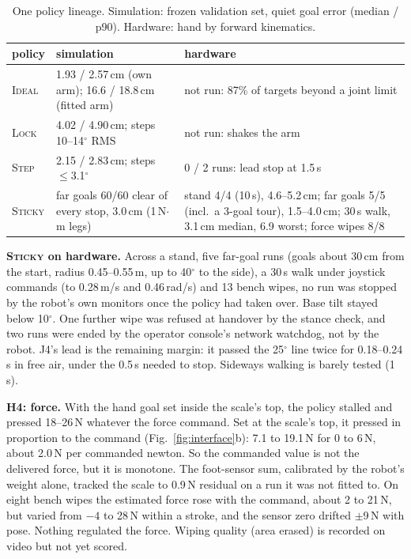 \documentclass[conference]{IEEEtran}
\newcommand{\hyp}[1]{\textbf{H#1}}
\begin{document}
\begin{table}[t]
\centering
\caption{One policy lineage. Simulation: frozen validation set, quiet goal error (median / p90).
Hardware: hand by forward kinematics.}
\label{tab:policy}
\footnotesize
\setlength{\tabcolsep}{2.5pt}
\begin{tabular}{@{}p{}p{}p{}@{}}
\toprule
policy & simulation & hardware \\
\midrule
\textsc{Ideal} & 1.93 / 2.57\,cm (own arm); 16.6 / 18.8\,cm (fitted arm) & not run: 87\% of targets beyond a joint limit \\
\textsc{Lock} & 4.02 / 4.90\,cm; steps 10--14$^\circ$ RMS & not run: shakes the arm \\
\textsc{Step} & 2.15 / 2.83\,cm; steps $\le$3.1$^\circ$ & 0 / 2 runs: lead stop at 1.5\,s \\
\textsc{Sticky} & far goals 60/60 clear of every stop, 3.0\,cm (1\,N$\cdot$m legs) & stand 4/4 (10\,s), 4.6--5.2\,cm; far goals 5/5 (incl.\ a 3-goal tour), 1.5--4.0\,cm; 30\,s walk, 3.1\,cm median, 6.9 worst; force wipes 8/8 \\
\bottomrule
\end{tabular}
\end{table}

\textbf{\textsc{Sticky} on hardware.} Across a stand, five far-goal runs (goals about 30\,cm from the start, radius
0.45--0.55\,m, up to 40$^\circ$ to the side), a 30\,s walk under joystick commands (to 0.28\,m/s and 0.46\,rad/s) and
13 bench wipes, no run was stopped by the robot's own monitors once the policy had taken over. Base tilt stayed below
10$^\circ$. One further wipe was refused at handover by the stance check, and two runs were ended by the operator
console's network watchdog, not by the robot. J4's lead is the remaining margin: it passed the
25$^\circ$ line twice for 0.18--0.24\,s in free air, under the 0.5\,s needed to stop. Sideways walking is barely tested
(1\,s).

\textbf{\hyp{4}: force.} With the hand goal set inside the scale's top, the policy stalled and pressed 18--26\,N whatever
the force command. Set at the scale's top, it pressed in proportion to the command (Fig.~\ref{fig:interface}b): 7.1 to
19.1\,N for 0 to 6\,N, about 2.0\,N per commanded newton. So the commanded value is not the delivered force, but it is
monotone. The foot-sensor sum, calibrated by the robot's weight alone, tracked the scale to 0.9\,N residual on a run it
was not fitted to. On eight bench wipes the estimated force rose with the command, about 2 to 21\,N, but varied from
$-4$ to 28\,N within a stroke, and the sensor zero drifted $\pm$9\,N with pose. Nothing regulated the force. Wiping
quality (area erased) is recorded on video but not yet scored.
\end{document}
